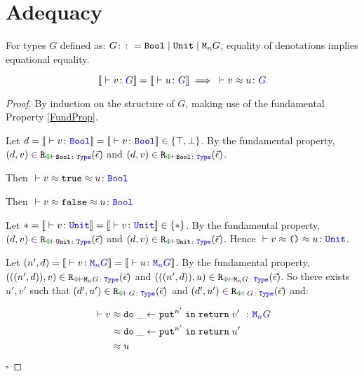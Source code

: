 \section{Adequacy}
\label{AdequacySection}


\begin{framed}
    
    \begin{theorem}[Adequacy]
        For types $G$ defined as: $ G\colon\colon= \texttt{Bool} \mid \texttt{Unit} \mid \texttt{M}_{n}{G}$, equality of denotations implies equational equality.
        
        \begin{equation}
            \deno{\ztyperelation{v}{G}} = \deno{\ztyperelation{u}{G}} \implies \zberelation{v}{u}{G}
        \end{equation}
        
    \end{theorem}
        
        \begin{proof}
            By induction on the structure of $G$, making use of the fundamental Property \ref{FundProp}.
        

            Let $d=\deno{\ztyperelation{v}{\B}}=\deno{\ztyperelation{v}{\B}}\in \{ \top, \bot\}$. By the fundamental property, $\inLogRelPE{d}{v}{\B}$  and $\inLogRelPE{d}{v}{\B}$.
        
            Then $\zberelation{v\beequiv\t}{u}{\B}$
        
            
            Then $\zberelation{v\beequiv\f}{u}{\B}$
        

            Let $\singleton=\deno{\ztyperelation{v}{\U}}=\deno{\ztyperelation{v}{\U}}\in \{\singleton\}$. By the fundamental property, $\inLogRelPE{d}{v}{\U}$  and $\inLogRelPE{d}{v}{\U}$. Hence $\zberelation{v\beequiv\u}{u}{\U}$.
        
            \case{\teffect}
        
            Let $( n',  d) = \deno{\ztyperelation{v}{\M{n}{G}}} = \deno{\ztyperelation{u}{\M{n}{G}}}$. By the fundamental property, $\inLogRelPE{((n', d))}{v}{\M{n}{G}}$ and $\inLogRelPE{((n', d))}{u}{\M{n}{G}}$. So there exists $u', v'$ such that $\inLogRelPE{d'}{u'}{G}$ and $\inLogRelPE{d'}{u'}{G}$ and:
        
            \begin{align*}
                \zberelation{v&}{\doin{\_}{\put^{n'}}{\return{v'}}}{\M{n}{G}}\\
                &\beequiv \doin{\_}{\put^{n'}}{\return{u'}}\\
                & \beequiv u
            \end{align*}
        $\square$
        \end{proof}
\end{framed}
